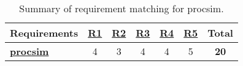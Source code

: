 \begin{table}[h!]
    \centering
    \begin{tabular}{l|cccccc}
        \textbf{Requirements} & \textbf{\hyperref[req:personal]{R1}} & \textbf{\hyperref[req:configuration]{R2}} & \textbf{\hyperref[req:pedagogical]{R3}} & \textbf{\hyperref[req:simulations]{R4}} & \textbf{\hyperref[req:modern]{R5}} & \textbf{Total} \\ \hline
        \textbf{\hyperref[ch:lua]{procsim}} & 
        4 & 3 & 4 & 4 & 5 & \textbf{20} \\
    \end{tabular}
    \caption{Summary of requirement matching for procsim.}
\end{table}